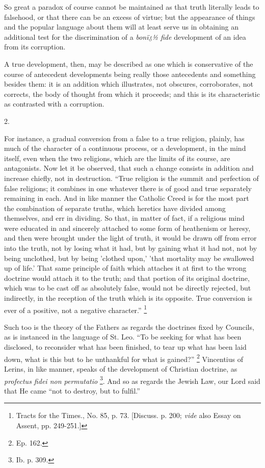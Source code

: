 So great a paradox of course cannot be maintained as
that truth literally leads to falsehood, or that there
can be an excess of virtue; but the appearance of things
and the popular language about them will at least serve
us in obtaining an additional test for the discrimination
of a \emph{bonï¿½ fide} development of an idea from its
corruption.

A true development, then, may be described as one
which is conservative of the course of antecedent
developments being really those antecedents and something
besides them: it is an addition which illustrates, not
obscures, corroborates, not corrects, the body of thought
from which it proceeds; and this is its characteristic as
contrasted with a corruption.

2.

For instance, a gradual conversion from a false to a
true religion, plainly, has much of the character of a
continuous process, or a development, in the mind itself,
even when the two religions, which are the limits of its
course, are antagonists. Now let it be observed, that
such a change consists in addition and increase chiefly,
not in destruction. ``True religion is the summit and
perfection of false religions; it combines in one
whatever there is of good and true separately remaining
in each. And in like manner the Catholic Creed is for the
most part the combination of separate truths, which
heretics have divided among themselves, and err in
dividing. So that, in matter of fact, if a religious mind
were educated in and sincerely attached to some form of
heathenism or heresy, and then were brought under the
light of truth, it would be drawn off from error into the
truth, not by losing what it had, but by gaining what it
had not, not by being unclothed, but by being 'clothed
upon,' 'that mortality may be swallowed up of life.' That
same principle of faith which attaches it at first to the
wrong doctrine would attach it to the truth; and that
portion of its original doctrine, which was to be cast
off as absolutely false, would not be directly rejected,
but indirectly, in the reception of the truth which is
its opposite. True conversion is ever of a positive, not
a negative character.'' \footnote{Tracts for the Times., No.
85, p. 73. [Discuss. p. 200; \emph{vide} also
Essay on Assent, pp. 249-251.]}

Such too is the theory of the Fathers as regards the
doctrines fixed by Councils, as is instanced in the
language of St. Leo. ``To be seeking for what has
been disclosed, to reconsider what has been finished, to
tear up what has been laid down, what is this but to he
unthankful for what is gained?'' \footnote{Ep. 162.} Vincentius of Lerins, in
like manner, speaks of the development of Christian
doctrine, as \emph{ profectus fidei non permutatio} \footnote{Ib. p. 309.}. And
so as regards the Jewish Law, our Lord said that He came
``not to destroy, but to fulfil.''

